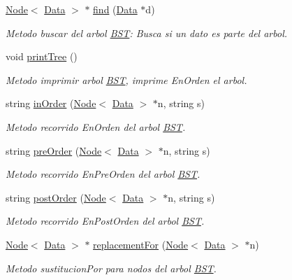 \begin{DoxyCompactItemize}
\hyperlink{class_node}{Node}$<$ \hyperlink{class_data}{Data} $>$ $\ast$ \hyperlink{class_b_s_t_a5d1f792ccf02006853a75f121fbe53d5}{find} (\hyperlink{class_data}{Data} $\ast$d)
\begin{DoxyCompactList}\small\item\em Metodo buscar del arbol \hyperlink{class_b_s_t}{B\+S\+T}\+: Busca si un dato es parte del arbol. \end{DoxyCompactList}\item 
void \hyperlink{class_b_s_t_ae0fa2476a85117c4087410d913824e80}{print\+Tree} ()
\begin{DoxyCompactList}\small\item\em Metodo imprimir arbol \hyperlink{class_b_s_t}{B\+S\+T}, imprime En\+Orden el arbol. \end{DoxyCompactList}\item 
string \hyperlink{class_b_s_t_a2c40901338176a3feb7deb18be9b279a}{in\+Order} (\hyperlink{class_node}{Node}$<$ \hyperlink{class_data}{Data} $>$ $\ast$n, string s)
\begin{DoxyCompactList}\small\item\em Metodo recorrido En\+Orden del arbol \hyperlink{class_b_s_t}{B\+S\+T}. \end{DoxyCompactList}\item 
string \hyperlink{class_b_s_t_a76dfc7270fabfcc113d0e1e6ce81a72e}{pre\+Order} (\hyperlink{class_node}{Node}$<$ \hyperlink{class_data}{Data} $>$ $\ast$n, string s)
\begin{DoxyCompactList}\small\item\em Metodo recorrido En\+Pre\+Orden del arbol \hyperlink{class_b_s_t}{B\+S\+T}. \end{DoxyCompactList}\item 
string \hyperlink{class_b_s_t_ae63ecda406953b0e2b32ddbdb9e8505a}{post\+Order} (\hyperlink{class_node}{Node}$<$ \hyperlink{class_data}{Data} $>$ $\ast$n, string s)
\begin{DoxyCompactList}\small\item\em Metodo recorrido En\+Post\+Orden del arbol \hyperlink{class_b_s_t}{B\+S\+T}. \end{DoxyCompactList}\item 
\hyperlink{class_node}{Node}$<$ \hyperlink{class_data}{Data} $>$ $\ast$ \hyperlink{class_b_s_t_afc638de07f0fa6f789f06883e080956e}{replacement\+For} (\hyperlink{class_node}{Node}$<$ \hyperlink{class_data}{Data} $>$ $\ast$n)
\begin{DoxyCompactList}\small\item\em Metodo sustitucion\+Por para nodos del arbol \hyperlink{class_b_s_t}{B\+S\+T}. \end{DoxyCompactList}\item 

\end{DoxyCompactItemize}
